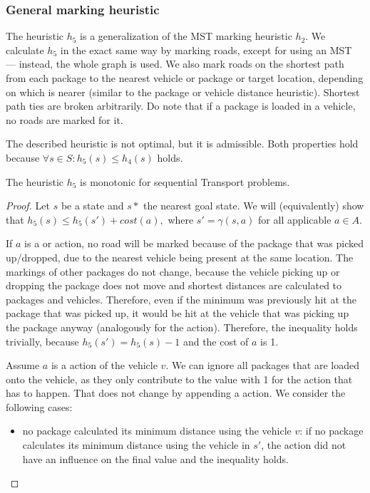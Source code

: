 \subsubsection{General marking heuristic}\label{sfa5}

The heuristic $h_5$ is a generalization of the MST marking heuristic $h_2$. We calculate $h_5$ in the exact same way by marking roads,
except for
using an MST --- instead, the whole graph is used.
We also mark roads on the shortest path from each package to the nearest
vehicle or package or target location, depending on which is nearer (similar
to the package or vehicle distance heuristic).
Shortest path ties are broken arbitrarily.
Do note that if a package is loaded in a vehicle, no roads are marked for it.

The described heuristic is not optimal, but it is admissible.
Both properties hold because $\forall s \in S : h_5(s) \leq h_4(s)$ holds.

\begin{thm}
The heuristic $h_5$ is monotonic for sequential Transport problems.
\end{thm}
\begin{proof}
Let $s$ be a state and $s*$ the nearest goal state.
We will (equivalently) show that $h_5(s) \leq h_5(s') + cost(a),$ where
$s' = \gamma(s, a)$ for all applicable $a \in A$.

If $a$ is a \pickup{} or \drop{} action,
no road will be marked because of the package that was picked up/dropped,
due to the nearest vehicle being present at the same location.
The markings of other packages do not change, because
the vehicle picking up or dropping the package does not move
and shortest distances are calculated to packages and vehicles.
Therefore, even if the minimum was previously hit at the package that was
picked up, it would be hit at the vehicle that was picking up
the package anyway (analogously for the \drop{} action).
Therefore, the inequality holds trivially, because $h_5(s') = h_5(s) - 1$ and the cost of $a$ is 1.

Assume $a$ is a \drive{} action of the vehicle $v$.
We can ignore all packages that are loaded onto the vehicle,
as they only contribute to the value with 1 for the \drop{} action
that has to happen. That does not change by appending a \drive{} action.
We consider the following cases:
\begin{itemize}
\item no package calculated its minimum distance using the vehicle $v$: if no package calculates its minimum distance using the vehicle
in $s'$, the \drive{} action did not have an influence
on the final value and the inequality holds.
\end{itemize}
\end{proof}


